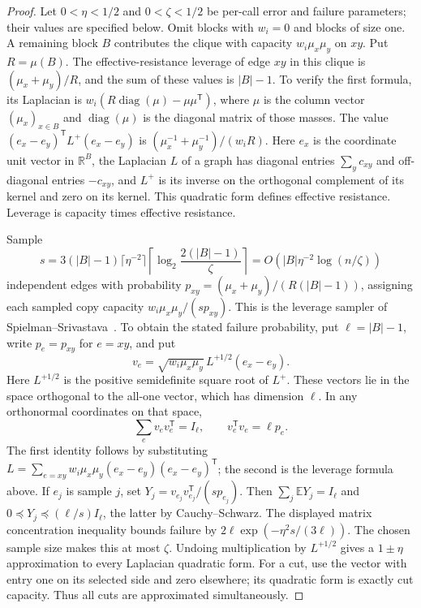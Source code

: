 \documentclass[11pt]{article}
\theoremstyle{definition}
\newcommand{\E}{\mathbb E}
\DeclareMathOperator{\diag}{diag}
\begin{document}
\begin{proof}
Let $0<\eta<1/2$ and $0<\zeta<1/2$ be per-call error and failure
parameters; their values are specified below. Omit blocks with $w_i=0$
and blocks of size one. A remaining block $B$ contributes the clique
with capacity $w_i\mu_x\mu_y$ on $xy$. Put $R=\mu(B)$. The effective-resistance leverage
of edge $xy$ in this clique is $(\mu_x+\mu_y)/R$, and the sum of these
values is $|B|-1$. To verify the first formula, its Laplacian is
$w_i(R\diag(\mu)-\mu\mu^{\mathsf T})$, where $\mu$ is the column
vector $(\mu_x)_{x\in B}$ and $\diag(\mu)$ is the diagonal matrix of
those masses. The value $(e_x-e_y)^{\mathsf T}L^+(e_x-e_y)$ is
$(\mu_x^{-1}+\mu_y^{-1})/(w_iR)$. Here $e_x$ is the coordinate unit
vector in $\mathbb R^B$, the Laplacian $L$ of a graph has diagonal entries $\sum_yc_{xy}$
and off-diagonal entries $-c_{xy}$, and $L^+$ is its inverse on the
orthogonal complement of its kernel and zero on its kernel.
This quadratic form defines effective resistance. Leverage is capacity
times effective resistance.

Sample
\[
 s=3(|B|-1)\lceil\eta^{-2}\rceil
                 \left\lceil\log_2\frac{2(|B|-1)}{\zeta}\right\rceil
   =O(|B|\eta^{-2}\log(n/\zeta))
\]
independent edges with probability $p_{xy}=(\mu_x+\mu_y)/(R(|B|-1))$, assigning each sampled
copy capacity $w_i\mu_x\mu_y/(sp_{xy})$. This is the leverage sampler
of Spielman--Srivastava~\cite{SS11}. To obtain the stated failure
probability, put $\ell=|B|-1$, write $p_e=p_{xy}$ for $e=xy$, and put
\[
 v_e=\sqrt{w_i\mu_x\mu_y}\,L^{+1/2}(e_x-e_y).
\]
Here $L^{+1/2}$ is the positive semidefinite square root of $L^+$.
These vectors lie in the space orthogonal to the all-one vector,
which has dimension $\ell$. In any orthonormal coordinates on that
space,
\[
 \sum_e v_ev_e^{\mathsf T}=I_\ell,\qquad
 v_e^{\mathsf T}v_e=\ell p_e.
\]
The first identity follows by substituting
$L=\sum_{e=xy}w_i\mu_x\mu_y(e_x-e_y)(e_x-e_y)^{\mathsf T}$;
the second is the leverage formula above. If $e_j$ is sample $j$,
set $Y_j=v_{e_j}v_{e_j}^{\mathsf T}/(sp_{e_j})$. Then
$\sum_j\E Y_j=I_\ell$ and $0\preceq Y_j\preceq(\ell/s)I_\ell$,
the latter by Cauchy--Schwarz. The displayed matrix concentration
inequality bounds failure by $2\ell\exp(-\eta^2s/(3\ell))$.
The chosen sample size makes this at most $\zeta$.
Undoing multiplication by $L^{+1/2}$ gives a $1\pm\eta$
approximation to every Laplacian quadratic form. For a cut, use the
vector with entry one on its selected side and zero elsewhere;
its quadratic form is exactly cut capacity. Thus all cuts are
approximated simultaneously.


\end{proof}
\end{document}
